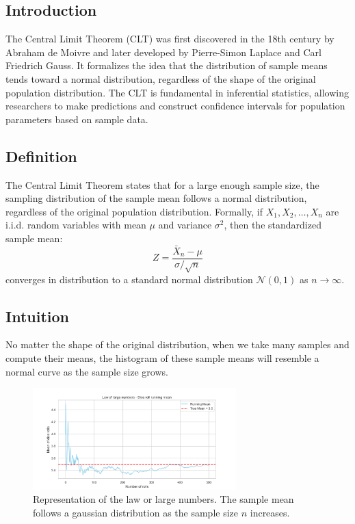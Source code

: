 \documentclass{book}
\begin{document}
\subsection{Introduction}
The Central Limit Theorem (CLT) was first discovered in the 18th century by Abraham de Moivre and later developed by Pierre-Simon Laplace and Carl Friedrich Gauss. It formalizes the idea that the distribution of sample means tends toward a normal distribution, regardless of the shape of the original population distribution. The CLT is fundamental in inferential statistics, allowing researchers to make predictions and construct confidence intervals for population parameters based on sample data.

\subsection{Definition}
The Central Limit Theorem states that for a large enough sample size, the sampling distribution of the sample mean follows a normal distribution, regardless of the original population distribution. Formally, if $X_1, X_2, \dots, X_n$ are i.i.d. random variables with mean $\mu$ and variance $\sigma^2$, then the standardized sample mean:
\begin{equation}
    Z = \frac{\bar{X}_n - \mu}{\sigma / \sqrt{n}}
\end{equation}
converges in distribution to a standard normal distribution $\mathcal{N}(0,1)$ as $n \to \infty$.

\subsection{Intuition}
No matter the shape of the original distribution, when we take many samples and compute their means, the histogram of these sample means will resemble a normal curve as the sample size grows.

\begin{figure}[ht]
    \centering
    \includegraphics[width=0.7\textwidth]{figures/chapter3/law_large_numbers.png}
    \caption{Representation of the law or large numbers. The sample mean follows a gaussian distribution as the sample size $n$ increases.}
    \label{fig:random}
\end{figure}
\end{document}

